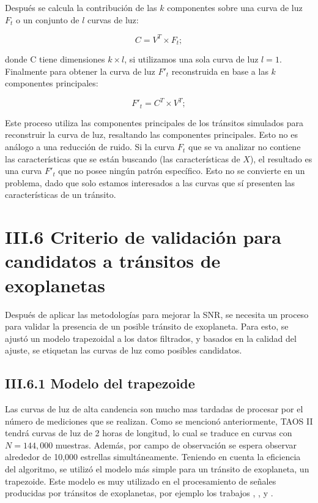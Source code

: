 Después se calcula la contribución de las $k$ componentes sobre una curva de luz $F_{t}$ o un conjunto de $l$ curvas de luz:

\begin{equation}
  \displaystyle C=V^{T} \times F_{t};
\end{equation}

donde C tiene dimensiones $k\times l$, si utilizamos una sola curva de luz $l=1$. Finalmente para obtener la curva de luz $F'_{t}$ reconstruida en base a las $k$ componentes principales:

\begin{equation}
  \displaystyle F'_{t}=C^{T} \times V^{T};
\end{equation}

Este proceso utiliza las componentes principales de los tránsitos simulados para reconstruir la curva de luz, resaltando las componentes principales. Esto no es análogo a una reducción de ruido. Si la curva $F_{t}$ que se va analizar no contiene las características que se están buscando (las características de $X$), el resultado es una curva $F'_{t}$ que no posee ningún patrón específico. Esto no se convierte en un problema, dado que solo estamos interesados a las curvas que sí presenten las características de un tránsito.


\section*{III.6 Criterio de validación para candidatos a tránsitos de exoplanetas}

Después de aplicar las metodologías para mejorar la SNR, se necesita un proceso para validar la presencia de un posible tránsito de exoplaneta. Para esto, se ajustó un modelo trapezoidal a los datos filtrados, y basados en la calidad del ajuste, se etiquetan las curvas de luz como posibles candidatos.

\subsection*{III.6.1 Modelo del trapezoide}

Las curvas de luz de alta candencia son mucho mas tardadas de procesar por el número de mediciones que se realizan. Como se mencionó anteriormente, TAOS II tendrá curvas de luz de 2 horas de longitud, lo cual se traduce en curvas con $N=144,000$ muestras. Además, por campo de observación se espera observar alrededor de 10,000 estrellas simultáneamente. Teniendo en cuenta la eficiencia del algoritmo, se utilizó el modelo más simple para un tránsito de exoplaneta, un trapezoide. Este modelo es muy utilizado en el procesamiento de señales producidas por tránsitos de exoplanetas, por ejemplo los trabajos \cite{alapini2010transiting}, \cite{hippke2019optimized}, \cite{kipping2016observational} y \cite{morton2012efficient}.


